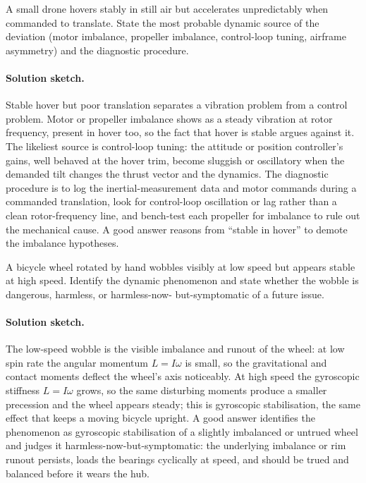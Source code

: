 \begin{exercise}
A small drone hovers stably in still air but accelerates
unpredictably when commanded to translate. State the most probable
dynamic source of the deviation (motor imbalance, propeller
imbalance, control-loop tuning, airframe asymmetry) and the
diagnostic procedure.
\paragraph{Solution sketch.} Stable hover but poor translation
separates a vibration problem from a control problem. Motor or
propeller imbalance shows as a steady vibration at rotor frequency,
present in hover too, so the fact that hover is stable argues against
it. The likeliest source is control-loop tuning: the attitude or
position controller's gains, well behaved at the hover trim, become
sluggish or oscillatory when the demanded tilt changes the thrust
vector and the dynamics. The diagnostic procedure is to log the
inertial-measurement data and motor commands during a commanded
translation, look for control-loop oscillation or lag rather than a
clean rotor-frequency line, and bench-test each propeller for
imbalance to rule out the mechanical cause. A good answer reasons from
``stable in hover'' to demote the imbalance hypotheses.
\end{exercise}

\begin{exercise}
A bicycle wheel rotated by hand wobbles visibly at low speed but
appears stable at high speed. Identify the dynamic phenomenon and
state whether the wobble is dangerous, harmless, or harmless-now-
but-symptomatic of a future issue.
\paragraph{Solution sketch.} The low-speed wobble is the visible
imbalance and runout of the wheel: at low spin rate the angular
momentum $L=I\omega$ is small, so the gravitational and contact
moments deflect the wheel's axis noticeably. At high speed the
gyroscopic stiffness $L=I\omega$ grows, so the same disturbing moments
produce a smaller precession and the wheel appears steady; this is
gyroscopic stabilisation, the same effect that keeps a moving bicycle
upright. A good answer identifies the phenomenon as gyroscopic
stabilisation of a slightly imbalanced or untrued wheel and judges it
harmless-now-but-symptomatic: the underlying imbalance or rim runout
persists, loads the bearings cyclically at speed, and should be trued
and balanced before it wears the hub.
\end{exercise}

